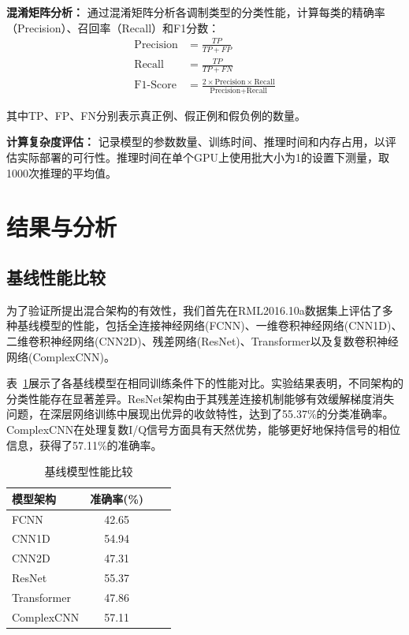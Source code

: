 \documentclass[conference]{IEEEtran}
\begin{document}
\textbf{混淆矩阵分析：}
通过混淆矩阵分析各调制类型的分类性能，计算每类的精确率（Precision）、召回率（Recall）和F1分数：
\begin{align}
\text{Precision} &= \frac{TP}{TP + FP} \\
\text{Recall} &= \frac{TP}{TP + FN} \\
\text{F1-Score} &= \frac{2 \times \text{Precision} \times \text{Recall}}{\text{Precision} + \text{Recall}}
\end{align}

其中TP、FP、FN分别表示真正例、假正例和假负例的数量。

\textbf{计算复杂度评估：}
记录模型的参数数量、训练时间、推理时间和内存占用，以评估实际部署的可行性。推理时间在单个GPU上使用批大小为1的设置下测量，取1000次推理的平均值。

\section{结果与分析}

\subsection{基线性能比较}

为了验证所提出混合架构的有效性，我们首先在RML2016.10a数据集上评估了多种基线模型的性能，包括全连接神经网络(FCNN)、一维卷积神经网络(CNN1D)、二维卷积神经网络(CNN2D)、残差网络(ResNet)、Transformer以及复数卷积神经网络(ComplexCNN)。

表~\ref{tab:baseline_comparison}展示了各基线模型在相同训练条件下的性能对比。实验结果表明，不同架构的分类性能存在显著差异。ResNet架构由于其残差连接机制能够有效缓解梯度消失问题，在深层网络训练中展现出优异的收敛特性，达到了55.37\%的分类准确率。ComplexCNN在处理复数I/Q信号方面具有天然优势，能够更好地保持信号的相位信息，获得了57.11\%的准确率。

\begin{table}[h]
\centering
\caption{基线模型性能比较}
\label{tab:baseline_comparison}
\begin{tabular}{@{}lccc@{}}
\toprule
模型架构 & 准确率(\%) \\
\midrule
FCNN & 42.65 \\
CNN1D & 54.94 \\
CNN2D & 47.31 \\
ResNet & 55.37 \\
Transformer & 47.86 \\
ComplexCNN & 57.11 \\
\bottomrule
\end{tabular}
\end{table}
\end{document}
